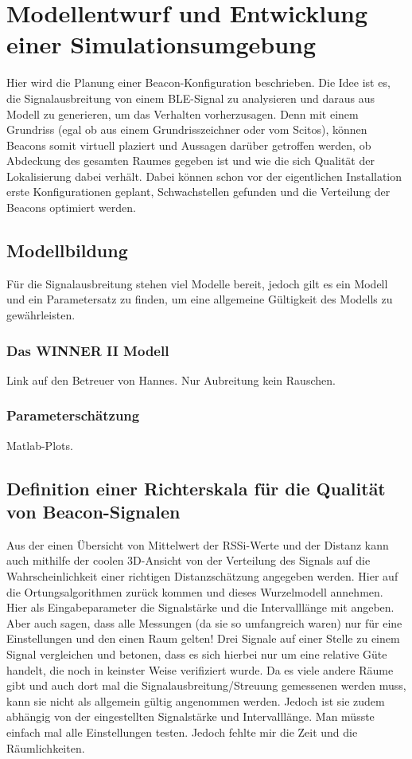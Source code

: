 \chapter{Modellentwurf und Entwicklung einer Simulationsumgebung}
Hier wird die Planung einer Beacon-Konfiguration beschrieben. Die Idee ist es, die Signalausbreitung von einem BLE-Signal zu analysieren und daraus aus Modell zu generieren, um das Verhalten vorherzusagen. Denn mit einem Grundriss (egal ob aus einem Grundrisszeichner oder vom Scitos), können Beacons somit virtuell plaziert und Aussagen darüber getroffen werden, ob Abdeckung des gesamten Raumes gegeben ist und wie die sich Qualität der Lokalisierung dabei verhält. Dabei können schon vor der eigentlichen Installation erste Konfigurationen geplant, Schwachstellen gefunden und die Verteilung der Beacons optimiert werden. 
\section{Modellbildung}
Für die Signalausbreitung stehen viel Modelle bereit, jedoch gilt es ein Modell und ein Parametersatz zu finden, um eine allgemeine Gültigkeit des Modells zu gewährleisten. 
\subsection{Das WINNER II Modell}
Link auf den Betreuer von Hannes. Nur Aubreitung kein Rauschen.
\subsection{Parameterschätzung}
Matlab-Plots.

\section{Definition einer Richterskala für die Qualität von Beacon-Signalen}
Aus der einen Übersicht von Mittelwert der RSSi-Werte und der Distanz kann auch mithilfe der coolen 3D-Ansicht von der Verteilung des Signals auf die Wahrscheinlichkeit einer richtigen Distanzschätzung angegeben werden. Hier auf die Ortungsalgorithmen zurück kommen und dieses Wurzelmodell annehmen. Hier als Eingabeparameter die Signalstärke und die Intervalllänge mit angeben. Aber auch sagen, dass alle Messungen (da sie so umfangreich waren) nur für eine Einstellungen und den einen Raum gelten! Drei Signale auf einer Stelle zu einem Signal vergleichen und betonen, dass es sich hierbei nur um eine relative Güte handelt, die noch in keinster Weise verifiziert wurde. Da es viele andere Räume gibt und auch dort mal die Signalausbreitung/Streuung gemessenen werden muss, kann sie nicht als allgemein gültig angenommen werden. Jedoch ist sie zudem abhängig von der eingestellten Signalstärke und Intervalllänge. Man müsste einfach mal alle Einstellungen testen. Jedoch fehlte mir die Zeit und die Räumlichkeiten.  

